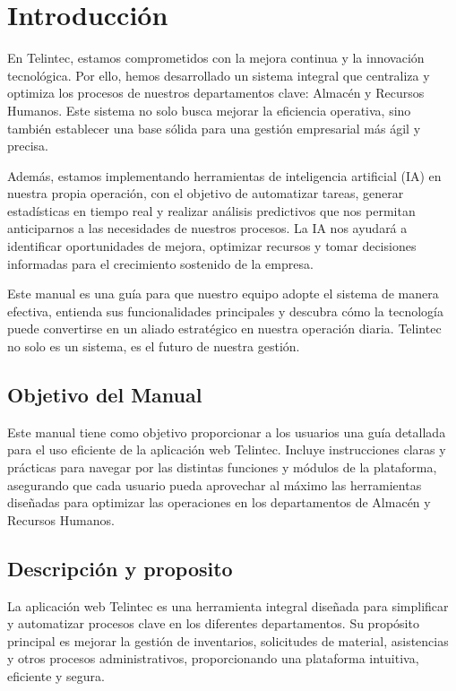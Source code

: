 \chapter{Introducción}
\begin{justify}
    

En Telintec, estamos comprometidos con la mejora continua y la innovación tecnológica. Por ello, hemos desarrollado un sistema integral que centraliza y optimiza los procesos de nuestros departamentos clave: Almacén y Recursos Humanos. Este sistema no solo busca mejorar la eficiencia operativa, sino también establecer una base sólida para una gestión empresarial más ágil y precisa. 
\begin{justify}
Además, estamos implementando herramientas de inteligencia artificial (IA) en nuestra propia operación, con el objetivo de automatizar tareas, generar estadísticas en tiempo real y realizar análisis predictivos que nos permitan anticiparnos a las necesidades de nuestros procesos. La IA nos ayudará a identificar oportunidades de mejora, optimizar recursos y tomar decisiones informadas para el crecimiento sostenido de la empresa. 
\end{justify}
Este manual es una guía para que nuestro equipo adopte el sistema de manera efectiva, entienda sus funcionalidades principales y descubra cómo la tecnología puede convertirse en un aliado estratégico en nuestra operación diaria. Telintec no solo es un sistema, es el futuro de nuestra gestión. 
\end{justify}
\newpage
\pagestyle{fancy}

\section{Objetivo del Manual }
 \begin{justify}
Este manual tiene como objetivo proporcionar a los usuarios una guía detallada para el uso eficiente de la aplicación web Telintec. Incluye instrucciones claras y prácticas para navegar por las distintas funciones y módulos de la plataforma, asegurando que cada usuario pueda aprovechar al máximo las herramientas diseñadas para optimizar las operaciones en los departamentos de Almacén y Recursos Humanos. 
\end{justify}
\section{Descripción y proposito}
\begin{justify}
La aplicación web Telintec es una herramienta integral diseñada para simplificar y automatizar procesos clave en los diferentes departamentos. Su propósito principal es mejorar la gestión de inventarios, solicitudes de material, asistencias y otros procesos administrativos, proporcionando una plataforma intuitiva, eficiente y segura. 
\end{justify}
